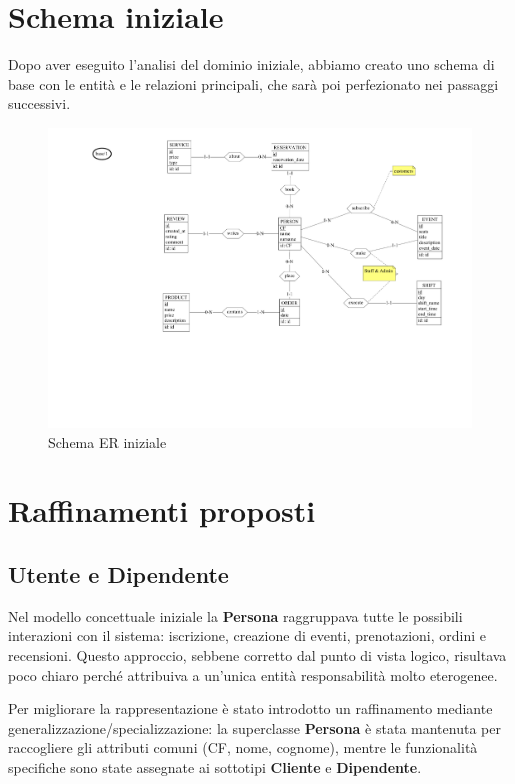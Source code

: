 \documentclass[a4paper,12pt]{report}
\begin{document}
\section{Schema iniziale}
Dopo aver eseguito l'analisi del dominio iniziale, abbiamo creato uno
schema di base con le entità e le relazioni principali, che sarà poi
perfezionato nei passaggi successivi.
\begin{figure}[H]
  \centering
  \includegraphics[width=\textwidth, trim=200pt 170pt 50pt 0pt,
  clip]{./schemas/base.pdf}
  \caption{Schema ER iniziale}
  \label{fig:schema-iniziale}
\end{figure}

\section{Raffinamenti proposti}
\subsection{Utente e Dipendente}
Nel modello concettuale iniziale la \textbf{Persona} raggruppava
tutte le possibili interazioni con il sistema: iscrizione, creazione
di eventi, prenotazioni, ordini e recensioni. Questo approccio,
sebbene corretto dal punto di vista logico, risultava poco chiaro
perché attribuiva a un'unica entità responsabilità molto eterogenee.

\vspace{\baselineskip}
Per migliorare la rappresentazione è stato introdotto un raffinamento
mediante generalizzazione/specializzazione: la superclasse
\textbf{Persona} è stata mantenuta per raccogliere gli attributi
comuni (CF, nome, cognome), mentre le funzionalità specifiche sono
state assegnate ai sottotipi \textbf{Cliente} e \textbf{Dipendente}.
\end{document}
